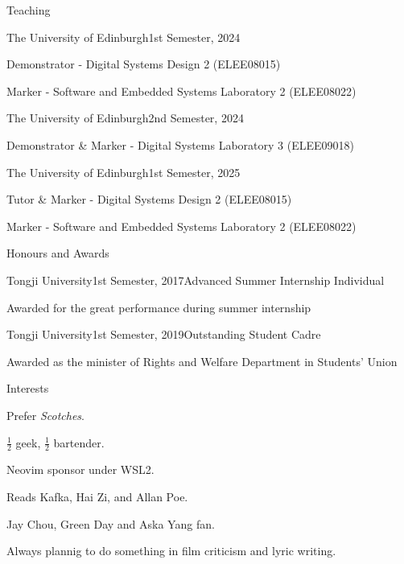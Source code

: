 \documentclass{resume} %
\begin{document}
\begin{rSection}{Teaching}
	
	\begin{rSubsection}{The University of Edinburgh}{1st Semester, 2024}{}{}
		\item Demonstrator - Digital Systems Design 2 (ELEE08015)
		\item Marker - Software and Embedded Systems Laboratory 2 (ELEE08022)
	\end{rSubsection}
	
	\begin{rSubsection}{The University of Edinburgh}{2nd Semester, 2024}{}{}
		\item Demonstrator \& Marker - Digital Systems Laboratory 3 (ELEE09018)
	\end{rSubsection}
	
	\begin{rSubsection}{The University of Edinburgh}{1st Semester, 2025}{}{}
		\item Tutor \& Marker - Digital Systems Design 2 (ELEE08015)
		\item Marker - Software and Embedded Systems Laboratory 2 (ELEE08022)
	\end{rSubsection}
	
\end{rSection}

\begin{rSection}{Honours and Awards}
	
	\begin{rSubsection}{Tongji University}{1st Semester, 2017}{Advanced Summer Internship Individual}{}
		\item Awarded for the great performance during summer internship
	\end{rSubsection}
		
	\begin{rSubsection}{Tongji University}{1st Semester, 2019}{Outstanding Student Cadre}{}
		\item Awarded as the minister of Rights and Welfare Department in Students' Union
	\end{rSubsection}

\end{rSection}

\begin{rSection}{Interests}
	\item Prefer \textit{Scotches}.
	\item $\frac{1}{2}$ geek, $\frac{1}{2}$ bartender.
	\item Neovim sponsor under WSL2.
	\item Reads Kafka, Hai Zi, and Allan Poe.
	\item Jay Chou, Green Day and Aska Yang fan. 
	\item Always plannig to do something in film criticism and lyric writing.
\end{rSection}
\end{document}
